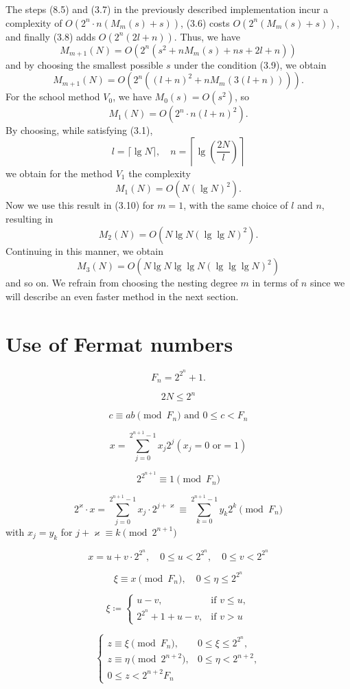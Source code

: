 \documentclass{article}
\begin{document}
The steps (8.5) and (3.7) in the previously described implementation incur a complexity of $O(2^n \cdot n(M_m(s) + s))$, (3.6) costs $O(2^n (M_m(s) + s))$, and finally (3.8) adds $O(2^n (2l + n))$. Thus, we have
\[
M_{m + 1}(N) = O(2^n (s^2 + n M_m(s) + ns + 2l + n))
\]
and by choosing the smallest possible $s$ under the condition (3.9), we obtain
\[
\tag{3.10}
M_{m + 1}(N) = O(2^n((l + n)^2 + nM_m(3(l + n)))).
\]
For the school method $V_0$, we have $M_0(s) = O(s^2)$, so
\[
M_1(N) = O(2^n \cdot n(l + n)^2).
\]
By choosing, while satisfying (3.1),
\[
l = \lceil \lg N \rceil, \quad n = \left\lceil \lg\left(\frac{2N}{l}\right)\right\rceil
\]
we obtain for the method $V_1$ the complexity
\[
\tag{3.11}
M_1(N) = O(N (\lg N)^2).
\]
Now we use this result in (3.10) for $m = 1$, with the same choice of $l$ and $n$, resulting in
\[
M_2(N) = O(N \lg N (\lg \lg N)^2).
\]
Continuing in this manner, we obtain
\[
M_3(N) = O(N \lg N \lg \lg N (\lg \lg \lg N)^2)
\]
and so on. We refrain from choosing the nesting degree $m$ in terms of $n$ since we will describe an even faster method in the next section.

\section{Use of Fermat numbers}
\[
F_n = 2^{2^n} + 1.
\]

\[
\tag{4.1}
2N \le 2^n
\]

\[
\tag{4.2}
c \equiv ab \pmod{F_n}\text{ and }0 \le c < F_n
\]

\[
\tag{4.3}
x = \sum_{j = 0}^{2^{n + 1} - 1} x_j 2^j (x_j = 0\text{ or}= 1)
\]

\[
\tag{4.4}
2^{2^{n + 1}} \equiv 1 \pmod{F_n}
\]

\[
2^\varkappa \cdot x = \sum_{j = 0}^{2^{n + 1} - 1} x_j \cdot 2^{j + \varkappa} \equiv \sum_{k = 0}^{2^{n + 1} - 1} y _k 2^k \pmod{F_n}
\] with $x_j = y_k$ for $j + \varkappa \equiv k \pmod {2^{n + 1}}$

\[
\tag{4.5}
x = u + v \cdot 2^{2^n}, \quad 0 \le u < 2^{2^n}, \quad 0 \le v < 2^{2^n}
\]

\[
\xi \equiv x \pmod{F_n}, \quad 0 \le \eta \le 2^{2^n}
\]

\[
\tag{4.6}
\xi \coloneq
\begin{cases}
u - v, & \text{if }v \le u,\\
2^{2^n} + 1 + u - v, & \text{if }v > u
\end{cases}
\]

\[
\tag{4.7}
\begin{cases}
z \equiv \xi \pmod{F_n}, & 0 \le \xi \le 2^{2^n}, \\
z \equiv \eta \pmod{2^{n + 2}}, & 0 \le \eta < 2^{n + 2}, \\
0 \le z < 2^{n + 2} F_n
\end{cases}
\]
\end{document}
